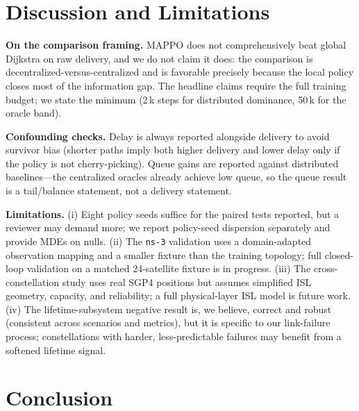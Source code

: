 \documentclass[conference,10pt]{IEEEtran}
\begin{document}
\section{Discussion and Limitations}
\label{sec:discussion}

\textbf{On the comparison framing.} MAPPO does not comprehensively beat global Dijkstra on raw delivery, and we do not claim it does: the comparison is decentralized-versus-centralized and is favorable precisely because the local policy closes most of the information gap. The headline claims require the full training budget; we state the minimum (2\,k steps for distributed dominance, 50\,k for the oracle band).

\textbf{Confounding checks.} Delay is always reported alongside delivery to avoid survivor bias (shorter paths imply both higher delivery and lower delay only if the policy is not cherry-picking). Queue gains are reported against distributed baselines---the centralized oracles already achieve low queue, so the queue result is a tail/balance statement, not a delivery statement.

\textbf{Limitations.} (i) Eight policy seeds suffice for the paired tests reported, but a reviewer may demand more; we report policy-seed dispersion separately and provide MDEs on nulls. (ii) The \texttt{ns-3} validation uses a domain-adapted observation mapping and a smaller fixture than the training topology; full closed-loop validation on a matched 24-satellite fixture is in progress. (iii) The cross-constellation study uses real SGP4 positions but assumes simplified ISL geometry, capacity, and reliability; a full physical-layer ISL model is future work. (iv) The lifetime-subsystem negative result is, we believe, correct and robust (consistent across scenarios and metrics), but it is specific to our link-failure process; constellations with harder, less-predictable failures may benefit from a softened lifetime signal.

\section{Conclusion}
\end{document}
